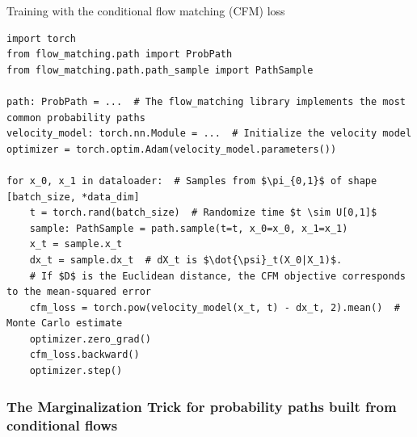 \documentclass{fairmeta}
\numberwithin{equation}{section}
\begin{document}
\begin{pbox}[label={ex:cfm_loss}]{Training with the conditional flow matching (CFM) loss}
\begin{verbatim}
import torch
from flow_matching.path import ProbPath
from flow_matching.path.path_sample import PathSample

path: ProbPath = ...  # The flow_matching library implements the most common probability paths
velocity_model: torch.nn.Module = ...  # Initialize the velocity model
optimizer = torch.optim.Adam(velocity_model.parameters())

for x_0, x_1 in dataloader:  # Samples from $\pi_{0,1}$ of shape [batch_size, *data_dim]
    t = torch.rand(batch_size)  # Randomize time $t \sim U[0,1]$
    sample: PathSample = path.sample(t=t, x_0=x_0, x_1=x_1) 
    x_t = sample.x_t
    dx_t = sample.dx_t  # dX_t is $\dot{\psi}_t(X_0|X_1)$.
    # If $D$ is the Euclidean distance, the CFM objective corresponds to the mean-squared error
    cfm_loss = torch.pow(velocity_model(x_t, t) - dx_t, 2).mean()  # Monte Carlo estimate
    optimizer.zero_grad()
    cfm_loss.backward()
    optimizer.step()
\end{verbatim}
\end{pbox}

\pagebreak
\subsubsection{The Marginalization Trick for probability paths built from conditional flows}
\end{document}
